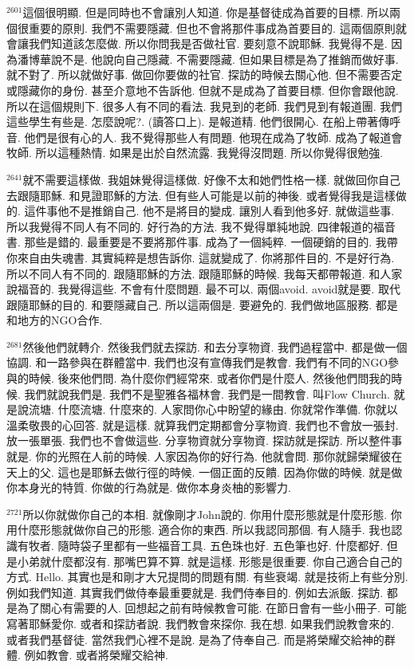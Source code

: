 \documentclass{book}
\begin{document}
$^{2601}$這個很明顯.
但是同時也不會讓別人知道.
你是基督徒成為首要的目標.
所以兩個很重要的原則.
我們不需要隱藏.
但也不會將那件事成為首要目的.
這兩個原則就會讓我們知道該怎麼做.
所以你問我是否做社官.
要刻意不說耶穌.
我覺得不是.
因為潘博華說不是.
他說向自己隱藏.
不需要隱藏.
但如果目標是為了推銷而做好事.
就不對了.
所以就做好事.
做回你要做的社官.
探訪的時候去關心他.
但不需要否定或隱藏你的身份.
甚至介意地不告訴他.
但就不是成為了首要目標.
但你會跟他說.
所以在這個規則下.
很多人有不同的看法.
我見到的老師.
我們見到有報道團.
我們這些學生有些是.
怎麼說呢?.
(讀答口上).
是報道精.
他們很開心.
在船上帶著傳呼音.
他們是很有心的人.
我不覺得那些人有問題.
他現在成為了牧師.
成為了報道會牧師.
所以這種熱情.
如果是出於自然流露.
我覺得沒問題.
所以你覺得很勉強.

$^{2641}$就不需要這樣做.
我姐妹覺得這樣做.
好像不太和她們性格一樣.
就做回你自己去跟隨耶穌.
和見證耶穌的方法.
但有些人可能是以前的神後.
或者覺得我是這樣做的.
這件事他不是推銷自己.
他不是將目的變成.
讓別人看到他多好.
就做這些事.
所以我覺得不同人有不同的.
好行為的方法.
我不覺得單純地說.
四律報道的福音書.
那些是錯的.
最重要是不要將那件事.
成為了一個純粹.
一個硬銷的目的.
我帶你來自由失魂書.
其實純粹是想告訴你.
這就變成了.
你將那件目的.
不是好行為.
所以不同人有不同的.
跟隨耶穌的方法.
跟隨耶穌的時候.
我每天都帶報道.
和人家說福音的.
我覺得這些.
不會有什麼問題.
最不可以.
兩個avoid.
avoid就是要.
取代跟隨耶穌的目的.
和要隱藏自己.
所以這兩個是.
要避免的.
我們做地區服務.
都是和地方的NGO合作.

$^{2681}$然後他們就轉介.
然後我們就去探訪.
和去分享物資.
我們過程當中.
都是做一個協調.
和一路參與在群體當中.
我們也沒有宣傳我們是教會.
我們有不同的NGO參與的時候.
後來他們問.
為什麼你們經常來.
或者你們是什麼人.
然後他們問我的時候.
我們就說我們是.
我們不是聖雅各福林會.
我們是一間教會.
叫Flow Church.
就是說流塘.
什麼流塘.
什麼來的.
人家問你心中盼望的緣由.
你就常作準備.
你就以溫柔敬畏的心回答.
就是這樣.
就算我們定期都會分享物資.
我們也不會放一張封.
放一張單張.
我們也不會做這些.
分享物資就分享物資.
探訪就是探訪.
所以整件事就是.
你的光照在人前的時候.
人家因為你的好行為.
他就會問.
那你就歸榮耀彼在天上的父.
這也是耶穌去做行徑的時候.
一個正面的反饋.
因為你做的時候.
就是做你本身光的特質.
你做的行為就是.
做你本身炎柚的影響力.

$^{2721}$所以你就做你自己的本相.
就像剛才John說的.
你用什麼形態就是什麼形態.
你用什麼形態就做你自己的形態.
適合你的東西.
所以我認同那個.
有人隨手.
我也認識有牧者.
隨時袋子里都有一些福音工具.
五色珠也好.
五色筆也好.
什麼都好.
但是小弟就什麼都沒有.
那嘴巴算不算.
就是這樣.
形態是很重要.
你自己適合自己的方式.
Hello.
其實也是和剛才大兄提問的問題有關.
有些衰竭.
就是技術上有些分別.
例如我們知道.
其實我們做侍奉最重要就是.
我們侍奉目的.
例如去派飯.
探訪.
都是為了關心有需要的人.
回想起之前有時候教會可能.
在節日會有一些小冊子.
可能寫著耶穌愛你.
或者和探訪者說.
我們教會來探你.
我在想.
如果我們說教會來的.
或者我們基督徒.
當然我們心裡不是說.
是為了侍奉自己.
而是將榮耀交給神的群體.
例如教會.
或者將榮耀交給神.
\end{document}
